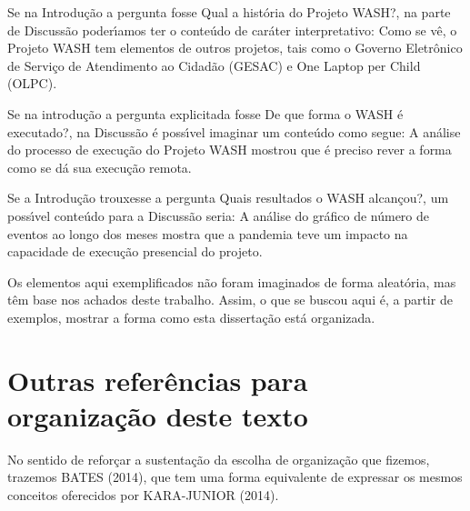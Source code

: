 \documentclass[
12pt,		%
openright,	%
twoside,  %
a4paper,			%
chapter=TITLE,		%
english,			%
french,				%
spanish,			%
brazil				%
]{USPSC-classe/USPSC}
\begin{document}
\begin{alineas}
\item Se na Introdu\c{c}\~ao a pergunta fosse \textquotedbl Qual a hist\'oria do Projeto WASH?\textquotedbl , na parte de Discuss\~ao poder\'{\i}amos ter o conte\'udo de car\'ater interpretativo: \textquotedbl Como se v\^e, o Projeto WASH tem elementos de outros projetos, tais como o Governo Eletr\^onico de Servi\c{c}o de Atendimento ao Cidad\~ao (GESAC) e One Laptop per Child (OLPC)\textquotedbl .
\item Se na introdu\c{c}\~ao a pergunta explicitada fosse \textquotedbl De que forma o WASH \'e executado?\textquotedbl , na Discuss\~ao \'e poss\'{\i}vel imaginar um conte\'udo como segue: \textquotedbl A an\'alise do processo de execu\c{c}\~ao do Projeto WASH mostrou que \'e preciso rever a forma como se d\'a sua execu\c{c}\~ao remota\textquotedbl .
\item Se a Introdu\c{c}\~ao trouxesse a pergunta \textquotedbl Quais resultados o WASH alcan\c{c}ou?\textquotedbl , um poss\'{\i}vel conte\'udo para a Discuss\~ao seria: \textquotedbl A an\'alise do gr\'afico de n\'umero de eventos ao longo dos meses mostra que a pandemia teve um impacto na capacidade de execu\c{c}\~ao presencial do projeto.\textquotedbl 
\end{alineas}

Os elementos aqui exemplificados n\~ao foram imaginados de forma aleat\'oria, mas t\^em base nos achados deste trabalho. Assim, o que se buscou aqui \'e, a partir de exemplos, mostrar a forma como esta disserta\c{c}\~ao est\'a organizada.










\section[Outras refer\^encias para organiza\c{c}\~ao deste texto]{Outras refer\^encias para organiza\c{c}\~ao deste texto}\label{Outras refer\^encias para organiza\c{c}\~ao deste texto}
No sentido de refor\c{c}ar a sustenta\c{c}\~ao da escolha de organiza\c{c}\~ao que fizemos, trazemos  BATES (2014), que tem uma forma equivalente de expressar os mesmos conceitos oferecidos por  KARA-JUNIOR (2014).
\end{document}
